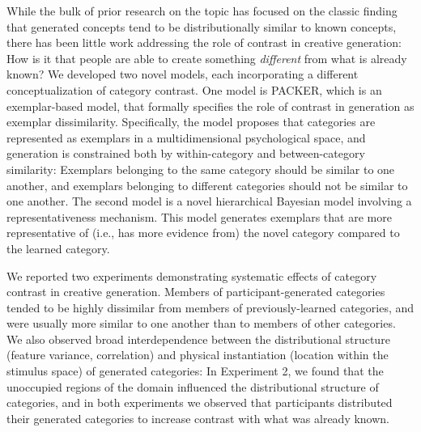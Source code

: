 \documentclass[12pt]{article}
\newcommand\jlanote[1]{\todo[inline, backgroundcolor = lime]{\textbf{JLA}: #1}}
\newcommand\sxlnote[1]{\todo[inline, backgroundcolor = cyan]{\textbf{SXL}: #1}}
\begin{document}
\begin{flushleft}
While the bulk of prior research on the topic has focused on the classic finding
that generated concepts tend to be distributionally similar to known concepts,
there has been little work addressing the role of contrast in creative
generation: How is it that people are able to create something {\em different}
from what is already known?
\jlanote{Update this next section:}
\sxlnote{Updated}
 We developed two novel models, each incorporating a
different conceptualization of category contrast. One model is PACKER, which is
an exemplar-based model, that formally specifies the role of contrast in
generation as exemplar dissimilarity. Specifically, the model proposes that
categories are represented as exemplars in a multidimensional psychological
space, and generation is constrained both by within-category and
between-category similarity: Exemplars belonging to the same category should be
similar to one another, and exemplars belonging to different categories should
not be similar to one another. The second model is a novel hierarchical
Bayesian model involving a representativeness mechanism. This model generates
exemplars that are more representative of (i.e., has more evidence from) the
novel category compared to the learned category.

We reported two experiments demonstrating systematic effects of category
contrast in creative generation. Members of participant-generated categories
tended to be highly dissimilar from members of previously-learned categories,
and were usually more similar to one another than to members of other
categories. We also observed broad interdependence between the distributional
structure (feature variance, correlation) and physical instantiation (location
within the stimulus space) of generated categories: In Experiment 2, we found
that the unoccupied regions of the domain influenced the distributional
structure of categories, and in both experiments we observed that participants
distributed their generated categories to increase contrast with what was
already known.


\end{flushleft}
\end{document}
